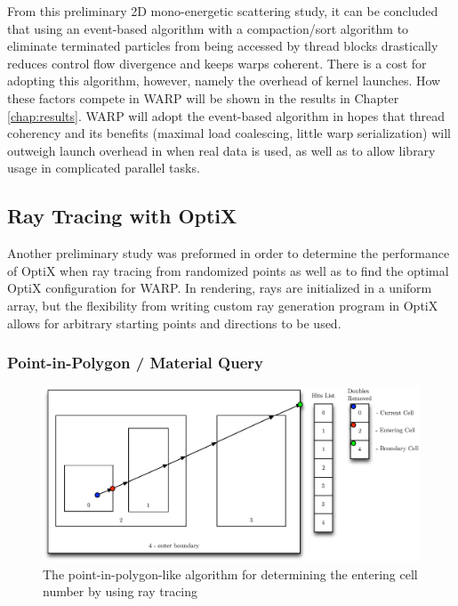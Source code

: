 From this preliminary 2D mono-energetic scattering study, it can be concluded that using an event-based algorithm with a compaction/sort algorithm to eliminate terminated particles from being accessed by thread blocks drastically reduces control flow divergence and keeps warps coherent.  There is a cost for adopting this algorithm, however, namely the overhead of kernel launches.  How these factors compete in WARP will be shown in the results in Chapter \ref{chap:results}.  WARP will adopt the event-based algorithm in hopes that thread coherency and its benefits (maximal load coalescing, little warp serialization) will outweigh launch overhead in when real data is used, as well as to allow library usage in complicated parallel tasks.

\subsection{Ray Tracing with OptiX}

Another preliminary study was preformed in order to determine the performance of OptiX when ray tracing from randomized points as well as to find the optimal OptiX configuration for WARP.  In rendering, rays are initialized in a uniform array, but the flexibility from writing custom ray generation program in OptiX allows for arbitrary starting points and directions to be used.

\subsubsection{Point-in-Polygon / Material Query}

\begin{figure}[h!] 
  \centering
    \includegraphics[width=1.0\textwidth]{graphics/whereami.eps}
     \caption{The point-in-polygon-like algorithm for determining the entering cell number by using ray tracing \label{whereami} }
\end{figure}


